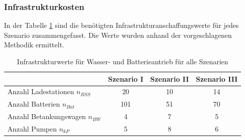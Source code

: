 \subsubsection{Infrastrukturkosten}
In der Tabelle \ref{Infrastrukturwerte_res} sind die benötigten 
Infrastrukturanschaffungswerte für jedes Szenario zusammengefasst. 
Die Werte wurden anhand der vorgeschlagenen Methodik ermittelt.\\
%
\begin{table}[h]
	\begin{center}
    \caption{Infrastrukturwerte für Wasser- und Batterieantrieb für alle Szenarien}
	\label{Infrastrukturwerte_res}
	\begin{tabular}{|l|c|c|c|}
		\hline
		 & \textbf{Szenario I}& \textbf{Szenario II}& \textbf{Szenario III} \\ \hline
		Anzahl Ladestationen $n_{BSS}$ & 20 & 10& 14\\ \hline
		Anzahl Batterien $n_{Bat}$ & 101 & 51& 70 \\ \hline
		Anzahl Betankungswagen $n_{BW}$ & 4 & 7 & 5\\ \hline
		Anzahl Pumpen $n_{kP}$  & 5 & 8 & 6\\ \hline
	\end{tabular}
    \end{center}
\end{table}

